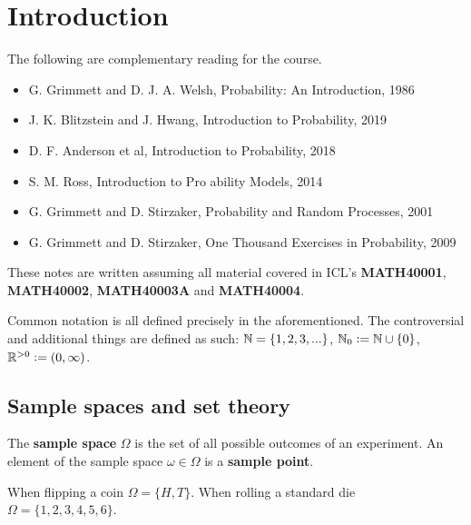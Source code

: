 \documentclass{article}
\begin{document}


\section{Introduction}


The following are complementary reading for the course.
\begin{itemize}
\item G. Grimmett and D. J. A. Welsh, Probability: An Introduction, 1986
\item J. K. Blitzstein and J. Hwang, Introduction to Probability, 2019
\item D. F. Anderson et al, Introduction to Probability, 2018
\item S. M. Ross, Introduction to Pro ability Models, 2014
\item G. Grimmett and D. Stirzaker, Probability and Random Processes, 2001
\item G. Grimmett and D. Stirzaker, One Thousand Exercises in Probability, 2009
\end{itemize}

These notes are written assuming all material covered in ICL's \textbf{MATH40001}, \textbf{MATH40002}, \textbf{MATH40003A} and \textbf{MATH40004}.

\begin{notation*}
    Common notation is all defined precisely in the aforementioned. The controversial and additional things are defined as such: $\mathbb{N} = \{1,2,3,...\}$, $\mathbb{N}_0 := \mathbb{N} \cup \{0\}$, $\mathbb{R}^{>0} := (0,\infty)$.
\end{notation*}


\subsection{Sample spaces and set theory}

\begin{definition}
    The \textbf{sample space} $\Omega$ is the set of all possible outcomes of an experiment. An element of the sample space $\omega \in \Omega$ is a \textbf{sample point}.
\end{definition}

\begin{examples}
    When flipping a coin $\Omega  = \{H,T\}$. When rolling a standard die $\Omega = \{1,2,3,4,5,6\}$.
\end{examples}
\end{document}
